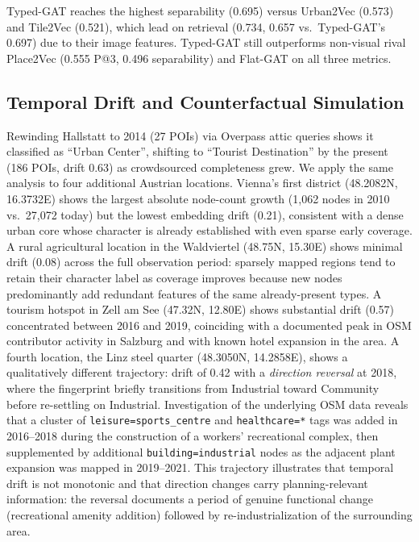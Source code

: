 \documentclass[]{interact}
\theoremstyle{plain}%
\theoremstyle{definition}
\theoremstyle{remark}
\begin{document}
Typed-GAT reaches the highest separability (0.695) versus Urban2Vec (0.573) and Tile2Vec (0.521), which lead on retrieval (0.734, 0.657 vs.\ Typed-GAT's 0.697) due to their image features. Typed-GAT still outperforms non-visual rival Place2Vec (0.555 P@3, 0.496 separability) and Flat-GAT on all three metrics.

\subsection{Temporal Drift and Counterfactual Simulation}
\label{sec:temporal}
\label{sec:counterfactual}

Rewinding Hallstatt to 2014 (27 POIs) via Overpass attic queries shows it classified as ``Urban Center'', shifting to ``Tourist Destination'' by the present (186 POIs, drift 0.63) as crowdsourced completeness grew. We apply the same analysis to four additional Austrian locations. Vienna's first district (48.2082\textdegree{}N, 16.3732\textdegree{}E) shows the largest absolute node-count growth (1,062 nodes in 2010 vs.~27,072 today) but the lowest embedding drift (0.21), consistent with a dense urban core whose character is already established with even sparse early coverage. A rural agricultural location in the Waldviertel (48.75\textdegree{}N, 15.30\textdegree{}E) shows minimal drift (0.08) across the full observation period: sparsely mapped regions tend to retain their character label as coverage improves because new nodes predominantly add redundant features of the same already-present types. A tourism hotspot in Zell am See (47.32\textdegree{}N, 12.80\textdegree{}E) shows substantial drift (0.57) concentrated between 2016 and 2019, coinciding with a documented peak in OSM contributor activity in Salzburg and with known hotel expansion in the area. A fourth location, the Linz steel quarter (48.3050\textdegree{}N, 14.2858\textdegree{}E), shows a qualitatively different trajectory: drift of 0.42 with a \emph{direction reversal} at 2018, where the fingerprint briefly transitions from Industrial toward Community before re-settling on Industrial. Investigation of the underlying OSM data reveals that a cluster of \texttt{leisure=sports\_centre} and \texttt{healthcare=*} tags was added in 2016--2018 during the construction of a workers' recreational complex, then supplemented by additional \texttt{building=industrial} nodes as the adjacent plant expansion was mapped in 2019--2021. This trajectory illustrates that temporal drift is not monotonic and that direction changes carry planning-relevant information: the reversal documents a period of genuine functional change (recreational amenity addition) followed by re-industrialization of the surrounding area.
\end{document}
